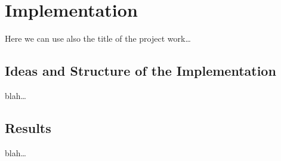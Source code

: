 \chapter{Implementation}

Here we can use also the title of the project work\dots
 
\section{Ideas and Structure of the Implementation}
blah\dots


\section{Results}

blah\dots
 


